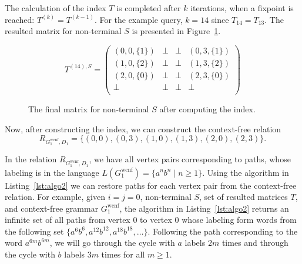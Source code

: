 The calculation of the index $T$ is completed after $k$ iterations, when a fixpoint is reached: $T^{(k)} = T^{(k-1)}$. For the example query, $k = 14$ since $T_{14} = T_{13}$. The resulted matrix for non-terminal $S$ is presented in Figure~\ref{ExampleQueryFinalMatrices}.

{\footnotesize
	\begin{figure}[h]
		\[
		T^{(14),S} = \begin{pmatrix}
			(0,0,\{1\}) & \bot       & \bot & (0,3,\{1\})       \\
			(1,0,\{2\}) & \bot & \bot       & (1,3,\{2\}) \\
			(2,0,\{0\})       & \bot & \bot & (2,3,\{0\}) \\
			\bot       & \bot & \bot & \bot \\
		\end{pmatrix}
		\]
		\caption{The final matrix for non-terminal $S$ after computing the index.}
		\label{ExampleQueryFinalMatrices}
	\end{figure}
}

Now, after constructing the index, we can construct the context-free relation $$R_{G_1^{\text{wcnf}}, D_1}=\{(0,0),(0,3),(1,0),(1,3),(2,0),(2,3)\}.$$

In the relation $R_{G_1^{\text{wcnf}}, D_1}$, we have all vertex pairs corresponding to paths, whose labeling is in the language $L(G_1^{\text{wcnf}}) = \{a^n b^n \mid n \geq 1\}$. Using the algorithm in Listing~\ref{lst:algo2} we can restore paths for each vertex pair from the context-free relation. For example, given $i=j=0$, non-terminal $S$, set of resulted matrices $T$, and context-free grammar $G_1^{\text{wcnf}}$, the algorithm in Listing~\ref{lst:algo2} returns an infinite set of all paths from vertex 0 to vertex 0 whose labeling form words from the following set $\{a^6 b^6, a^{12} b^{12}, a^{18} b^{18}, \ldots \}$. Following the path corresponding to the word $a^{6m} b^{6m}$, we will go through the cycle with $a$ labels $2m$ times and through the cycle with $b$ labels $3m$ times for all $m \geq 1$.